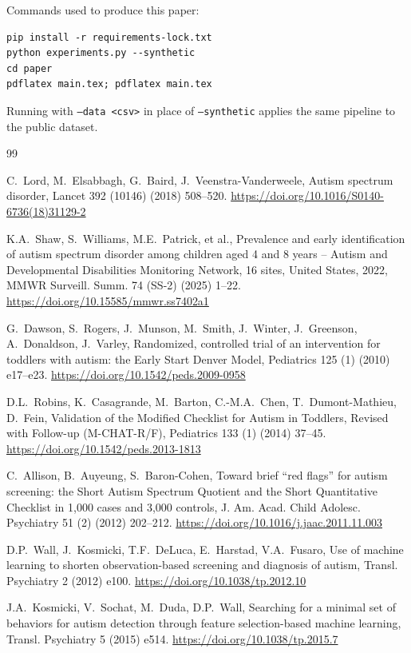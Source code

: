 \documentclass[5p,times,twocolumn]{elsarticle}
\begin{document}
\noindent Commands used to produce this paper:
\begin{verbatim}
pip install -r requirements-lock.txt
python experiments.py --synthetic
cd paper
pdflatex main.tex; pdflatex main.tex
\end{verbatim}
Running with \texttt{--data <csv>} in place of \texttt{--synthetic} applies the same pipeline to the public dataset.

\begin{thebibliography}{99}

C.~Lord, M.~Elsabbagh, G.~Baird, J.~Veenstra-Vanderweele, Autism spectrum disorder, Lancet 392 (10146) (2018) 508--520. \url{https://doi.org/10.1016/S0140-6736(18)31129-2}

K.A.~Shaw, S.~Williams, M.E.~Patrick, et al., Prevalence and early identification of autism spectrum disorder among children aged 4 and 8 years -- Autism and Developmental Disabilities Monitoring Network, 16 sites, United States, 2022, MMWR Surveill. Summ. 74 (SS-2) (2025) 1--22. \url{https://doi.org/10.15585/mmwr.ss7402a1}

G.~Dawson, S.~Rogers, J.~Munson, M.~Smith, J.~Winter, J.~Greenson, A.~Donaldson, J.~Varley, Randomized, controlled trial of an intervention for toddlers with autism: the Early Start Denver Model, Pediatrics 125 (1) (2010) e17--e23. \url{https://doi.org/10.1542/peds.2009-0958}

D.L.~Robins, K.~Casagrande, M.~Barton, C.-M.A.~Chen, T.~Dumont-Mathieu, D.~Fein, Validation of the Modified Checklist for Autism in Toddlers, Revised with Follow-up (M-CHAT-R/F), Pediatrics 133 (1) (2014) 37--45. \url{https://doi.org/10.1542/peds.2013-1813}

C.~Allison, B.~Auyeung, S.~Baron-Cohen, Toward brief ``red flags'' for autism screening: the Short Autism Spectrum Quotient and the Short Quantitative Checklist in 1,000 cases and 3,000 controls, J. Am. Acad. Child Adolesc. Psychiatry 51 (2) (2012) 202--212. \url{https://doi.org/10.1016/j.jaac.2011.11.003}

D.P.~Wall, J.~Kosmicki, T.F.~DeLuca, E.~Harstad, V.A.~Fusaro, Use of machine learning to shorten observation-based screening and diagnosis of autism, Transl. Psychiatry 2 (2012) e100. \url{https://doi.org/10.1038/tp.2012.10}

J.A.~Kosmicki, V.~Sochat, M.~Duda, D.P.~Wall, Searching for a minimal set of behaviors for autism detection through feature selection-based machine learning, Transl. Psychiatry 5 (2015) e514. \url{https://doi.org/10.1038/tp.2015.7}


\end{thebibliography}
\end{document}
